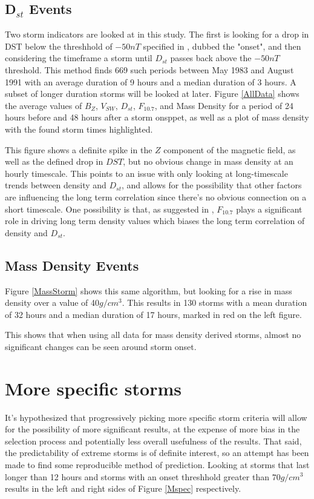 \documentclass[10pt,twocolumn]{article}
\begin{document}
\subsection{D$_{st}$ Events}
Two storm indicators are looked at in this study. The first is looking for a drop in DST below the threshhold of $-50nT$ specified in \cite{Takahashi2010}, dubbed the "onset", and then considering the timeframe a storm until $D_{st}$ passes back above the $-50nT$ threshold. This method finds 669 such periods between May 1983 and August 1991 with an average duration of 9 hours and a median duration of 3 hours. A subset of longer duration storms will be looked at later. Figure \ref{AllData} shows the average values of $B_Z$, $V_{SW}$, $D_{st}$, $F_{10.7}$, and Mass Density for a period of 24 hours before and 48 hours after a storm onsppet, as well as a plot of mass density with the found storm times highlighted.

This figure shows a definite spike in the $Z$ component of the magnetic field, as well as the defined drop in $DST$, but no obvious change in mass density at an hourly timescale. This points to an issue with only looking at long-timescale trends between density and $D_{st}$, and allows for the possibility that other factors are influencing the long term correlation since there's no obvious connection on a short timescale. One possibility is that, as suggested in \cite{Takahashi2010}, $F_{10.7}$ plays a significant role in driving long term density values which biases the long term correlation of density and $D_{st}$.

\subsection{Mass Density Events}
Figure \ref{MassStorm} shows this same algorithm, but looking for a rise in mass density over a value of 40$g/cm^3$. This results in 130 storms with a mean duration of 32 hours and a median duration of 17 hours, marked in red on the left figure.



This shows that when using all data for mass density derived storms, almost no significant changes can be seen around storm onset.



\section{More specific storms}
It's hypothesized that progressively picking more specific storm criteria will allow for the possibility of more significant results, at the expense of more bias in the selection process and potentially less overall usefulness of the results. That said, the predictability of extreme storms is of definite interest, so an attempt has been made to find some reproducible method of prediction. Looking at storms that last longer than 12 hours and storms with an onset threshhold greater than $70g/cm^3$ results in the left and right sides of Figure \ref{Mspec} respectively.
\end{document}
